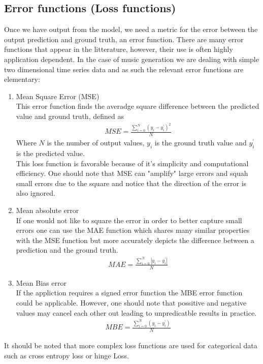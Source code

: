 \documentclass{article}
\begin{document}
\subsection{Error functions (Loss functions)}
\label{sec:error}
Once we have output from the model, we need a metric for the error between the output prediction and ground truth, an error function. There are many error functions that appear in the litterature, however, their use is often highly application dependent. In the case of music generation we are dealing with simple two dimensional time series data and as such the relevant error functions are elementary:
\begin{enumerate}
\item Mean Square Error (MSE)\\
This error function finds the averadge square difference between the predicted value and ground truth, defined as
\begin{align*}
MSE = \frac{\sum_{i=0}^N (y_i - y_i^\prime)^2}{N}
\end{align*}
Where $N$ is the number of output values, $y_i$ is the ground truth value and $y_i^\prime$ is the predicted value. \\
This loss function is favorable because of it's simplicity and computational efficiency. One should note that MSE can "amplify" large errors and squah small errors due to the square and notice that the direction of the error is also ignored.  
\item Mean absolute error \\
If one would not like to square the error in order to better capture small errors one can use the MAE function which shares many similar properties with the MSE function but more accurately depicts the difference between a prediction and the ground truth. 
\begin{align*}
MAE = \frac{\sum_{i=0}^N |y_i - y_i^\prime|}{N}
\end{align*}
\item Mean Bias error \\
If the appliction requires a signed error function the MBE error function could be applicable. However, one should note that possitive and negative values may cancel each other out leading to unpredicatble results in practice. 
\begin{align*}
MBE = \frac{\sum_{i=0}^N (y_i - y_i^\prime)}{N}
\end{align*}
\end{enumerate}
It should be noted that more complex loss functions are used for categorical data such as cross entropy loss or hinge Loss.
\end{document}
